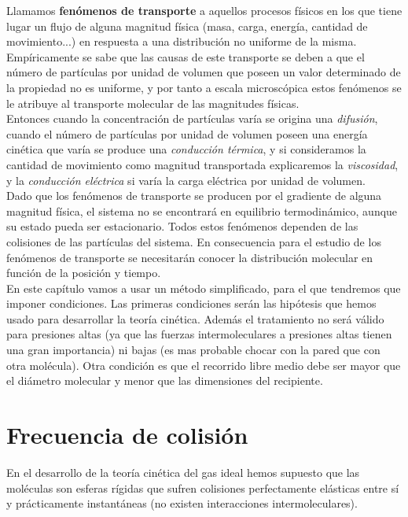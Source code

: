 \documentclass[12pt]{book}
\begin{document}
Llamamos \textbf{fenómenos de transporte} a aquellos procesos físicos en los que tiene lugar un flujo de alguna magnitud física (masa, carga, energía, cantidad de movimiento...) en respuesta a una distribución no uniforme de la misma. Empíricamente se sabe que las causas de este transporte se deben a que el número de partículas por unidad de volumen que poseen un valor determinado de la propiedad no es uniforme, y por tanto a escala microscópica estos fenómenos se le atribuye al transporte molecular de las magnitudes físicas. \\
 
Entonces cuando la concentración de partículas varía se origina una \textit{difusión}, cuando el número de partículas por unidad de volumen poseen una energía cinética que varía se produce una \textit{conducción térmica}, y si consideramos la cantidad de movimiento como magnitud transportada explicaremos la \textit{viscosidad}, y la \textit{conducción eléctrica} si varía la carga eléctrica por unidad de volumen. \\

Dado que los fenómenos de transporte se producen por el gradiente de alguna magnitud física, el sistema no se encontrará en equilibrio termodinámico, aunque su estado pueda ser estacionario. Todos estos fenómenos dependen de las colisiones de las partículas del sistema. En consecuencia para el estudio de los fenómenos de transporte se necesitarán conocer la distribución molecular en función de la posición y tiempo. \\

En este capítulo vamos a usar un método simplificado, para el que tendremos que imponer condiciones. Las primeras condiciones serán las hipótesis que hemos usado para desarrollar la teoría cinética. Además el tratamiento no será válido para presiones altas (ya que las fuerzas intermoleculares a presiones altas tienen una gran importancia) ni bajas (es mas probable chocar con la pared que con otra molécula). Otra condición es que el recorrido libre medio debe ser mayor que el diámetro molecular y menor que las dimensiones del recipiente. 

\section{Frecuencia de colisión}

En el desarrollo de la teoría cinética del gas ideal hemos supuesto que las moléculas son esferas rígidas que sufren colisiones perfectamente elásticas entre sí y prácticamente instantáneas (no existen interacciones intermoleculares). \\
\end{document}
